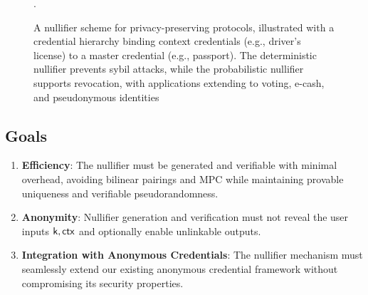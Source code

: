 \begin{figure}
    \caption[Nullifier Scheme for ]{A nullifier scheme for privacy-preserving protocols, illustrated with a credential hierarchy binding context credentials (e.g., driver’s license) to a master credential (e.g., passport). The deterministic nullifier prevents sybil attacks, while the probabilistic nullifier supports revocation, with applications extending to voting, e-cash, and pseudonymous identities}.
    \label{fig:credential-nullifier-revised}
\end{figure}


\subsection{Goals}


\begin{enumerate}
    \item \textbf{Efficiency}: The nullifier must be generated and verifiable with minimal overhead, avoiding bilinear pairings and MPC while maintaining provable uniqueness and verifiable pseudorandomness.
    
    \item \textbf{Anonymity}: Nullifier generation and verification must not reveal the user inputs $\mathsf{k}, \mathsf{ctx}$ and optionally enable unlinkable outputs. 
    
    \item \textbf{Integration with Anonymous Credentials}: The nullifier mechanism must seamlessly extend our existing anonymous credential framework without compromising its security properties.
\end{enumerate}

